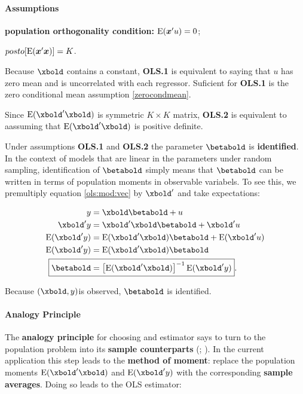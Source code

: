 \documentclass[11pt, oneside, a4paper, article]{article}
\numberwithin{equation}{section}
\begin{document}
\paragraph{Assumptions}

\begin{description}[itemsep = 1ex]
	\item[OLS.1]  \textbf{population orthogonality condition:} $\text{E}(\boldsymbol{x}'u) = 0$;

	\item[OLS.2]  $posto[ \text{E}( \boldsymbol{x}' \boldsymbol{x} ) ] = K$.
\end{description}

Because $\xbold$ contains a constant, \textbf{OLS.1} is equivalent to saying that $u$ has zero mean and is uncorrelated with each regressor.
Suficient for \textbf{OLS.1} is the zero conditional mean assumption \eqref{zerocondmean}.

Since $\E( \xbold'\xbold )$ is symmetric $K \times K$ matrix, \textbf{OLS.2} is equivalent to aassuming that $\E( \xbold'\xbold )$ is positive definite.

Under assumptions \textbf{OLS.1} and \textbf{OLS.2} the parameter $\betabold$ is \textbf{identified}.
In the context of models that are linear in the parameters under random sampling, identification of $\betabold$ simply means that $\betabold$ can be written in terms of population moments in observable variabels.
To see this, we premultiply equation \eqref{ols:mod:vec} by $\xbold'$ and take expectations:

\vspace{-1 em}
\begin{align*}
	y &= \xbold \betabold + u
	\\
	\xbold' y &= \xbold' \xbold \betabold + \xbold' u
	\\
	\E( \xbold' y) &= \E( \xbold' \xbold) \betabold + \E(\xbold' u)
	\\
	\E( \xbold' y) &= \E( \xbold' \xbold) \betabold
	\\
	\Aboxed{\betabold &= \left[ \E( \xbold' \xbold) \right]^{-1} \E( \xbold' y) }.
\end{align*}

Because $(\xbold, y)$is observed, $\betabold$ is identified.

\paragraph{Analogy Principle}
The \textbf{analogy principle} for choosing and estimator says to turn to the population problem into its \textbf{sample counterparts} (; ).
In the current application this step leads to the \textbf{method of moment}:
replace the population moments $\E( \xbold' \xbold)$ and $\E(\xbold' y)$ with the corresponding \textbf{sample averages}.
Doing so leads to the OLS estimator:
\end{document}
